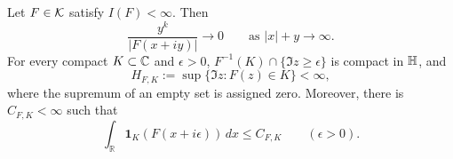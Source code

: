 \begin{lemma}
\label{lem:escape-trace}
Let $F\in\mathcal K$ satisfy $I(F)<\infty$.  Then
\begin{equation}
 \frac{y^k}{|F(x+iy)|}\longrightarrow0
       \qquad\text{as }|x|+y\longrightarrow\infty.
 \label{escape:tail}
\end{equation}
For every compact $K\subset\mathbb C$ and $\epsilon>0$,
$F^{-1}(K)\cap\{\Im z\ge\epsilon\}$ is compact in $\mathbb H$, and
\[
 H_{F,K}:=\sup\{\Im z:F(z)\in K\}<\infty,
\]
where the supremum of an empty set is assigned zero.  Moreover, there is
$C_{F,K}<\infty$ such that
\begin{equation}
 \int_{\mathbb R}\mathbf1_K(F(x+i\epsilon))\,dx
       \le C_{F,K}\qquad(\epsilon>0).
 \label{escape:trace}
\end{equation}
\end{lemma}
